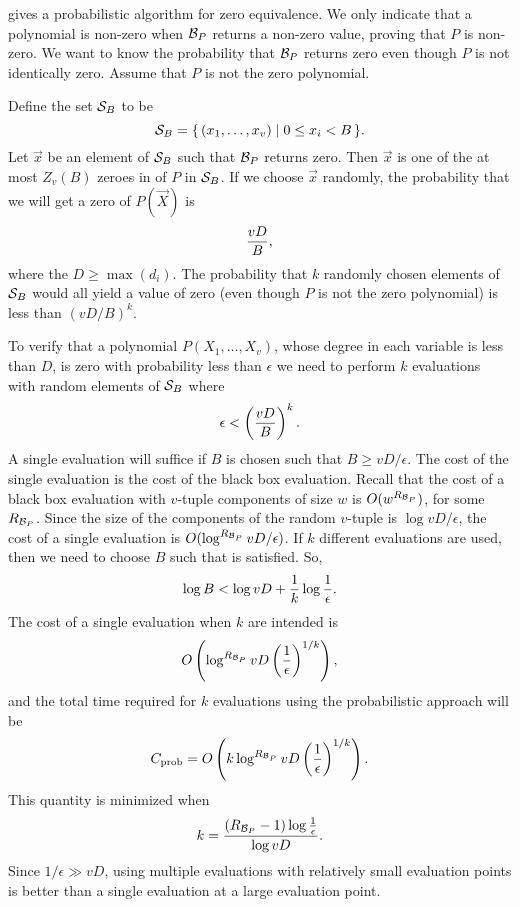 \medskip
{} gives a probabilistic algorithm for zero
equivalence.  We only indicate that a polynomial is non-zero when
${\cal B}_P$ returns a non-zero value, proving that $P$ is non-zero.
We want to know the probability that ${\cal B}_P$ returns zero even
though $P$ is not identically zero.  Assume that $P$ is not the zero
polynomial.

Define the set ${\cal S}_B$ to be
\[
{\cal S}_B = \{\,(x_1, \ldots, x_v) \mid 0 \le x_i < B\,\}.
\] 
Let $\vec{x}$ be an element of ${\cal S}_B$ such that ${\cal B}_P$
returns zero.  Then $\vec{x}$ is one of the at most $Z_v(B)$ zeroes in
of $P$ in ${\cal S}_B$.  If we choose $\vec{x}$ randomly, the
probability that we will get a zero of $P(\vec{X})$ is 
\[
{vD \over B},
\]
where the $D \ge \max(d_i)$.  The probability that $k$ randomly chosen
elements of ${\cal S}_B$ would all yield a value of zero (even though
$P$ is not the zero polynomial) is less than $(vD/B)^k$.

To verify that a polynomial $P(X_1, \ldots, X_v)$, whose degree in
each variable is less than $D$, is zero with probability less than
$\epsilon$ we need to perform $k$ evaluations with random elements of
${\cal S}_B$ where
\begin{equation}
\epsilon < \left({v D \over B}\right)^k. 
\label{Bound:Eq}
\end{equation}
A single evaluation will suffice if $B$ is chosen such that $B \ge
vD/\epsilon$.  The cost of the single evaluation is the cost of the
black box evaluation.  Recall that the cost of a black box evaluation
with $v$-tuple components of size $w$ is $O(w^{R_{{\cal B}_P}})$, for some
$R_{{\cal B}_P}$.  Since the size of the components of the random $v$-tuple is
$\log vD/\epsilon$, the cost of a single evaluation is
$O(\log^{R_{{\cal B}_P}} v D/\epsilon)$.  If $k$ different evaluations are
used, then we need to choose $B$ such that  is
satisfied.  So,
\[
\log B < \log vD + {1 \over k} \log {1 \over \epsilon}.
\]
The cost of a single evaluation when $k$ are intended is
\[
O\left(\log^{R_{{\cal B}_P}} {vD \left({1 \over \epsilon}\right)^{1/k}}\right),
\]
and the total time required for $k$ evaluations using the
probabilistic approach will be 
\[
C_{\rm prob} 
   = O\left(k \log^{R_{{\cal B}_P}} {vD \left({1 \over \epsilon}\right)^{1/k}}\right).
\]
This quantity is minimized when
\begin{equation}\label{Zero:PCount:Eq}
k = {({R_{{\cal B}_P}} - 1) \log{1 \over \epsilon} \over \log vD}.
\end{equation}
Since $1/\epsilon \gg vD$, using multiple evaluations with relatively
small evaluation points is better than a single evaluation at a
large evaluation point. 


